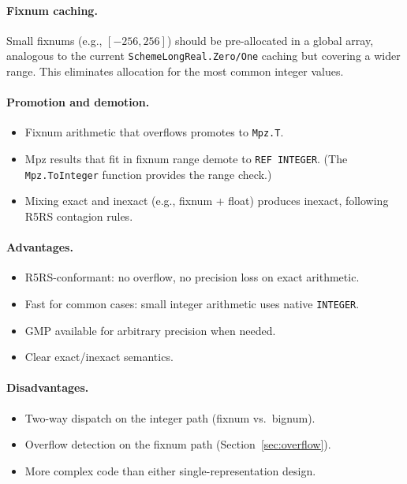\documentclass[12pt]{report}
\begin{document}
\paragraph{Fixnum caching.}
Small fixnums (e.g., $[-256, 256]$) should be pre-allocated in a
global array, analogous to the current {\tt SchemeLongReal.Zero/One}
caching but covering a wider range.  This eliminates allocation for
the most common integer values.

\paragraph{Promotion and demotion.}
\begin{itemize}
\item Fixnum arithmetic that overflows promotes to {\tt Mpz.T}.
\item Mpz results that fit in fixnum range demote to {\tt REF INTEGER}.
  (The {\tt Mpz.ToInteger} function provides the range check.)
\item Mixing exact and inexact (e.g., fixnum + float) produces
  inexact, following R5RS contagion rules.
\end{itemize}

\paragraph{Advantages.}
\begin{itemize}
\item R5RS-conformant: no overflow, no precision loss on exact
  arithmetic.
\item Fast for common cases: small integer arithmetic uses native
  {\tt INTEGER}.
\item GMP available for arbitrary precision when needed.
\item Clear exact/inexact semantics.
\end{itemize}

\paragraph{Disadvantages.}
\begin{itemize}
\item Two-way dispatch on the integer path (fixnum vs.\ bignum).
\item Overflow detection on the fixnum path (Section~\ref{sec:overflow}).
\item More complex code than either single-representation design.
\end{itemize}
\end{document}
